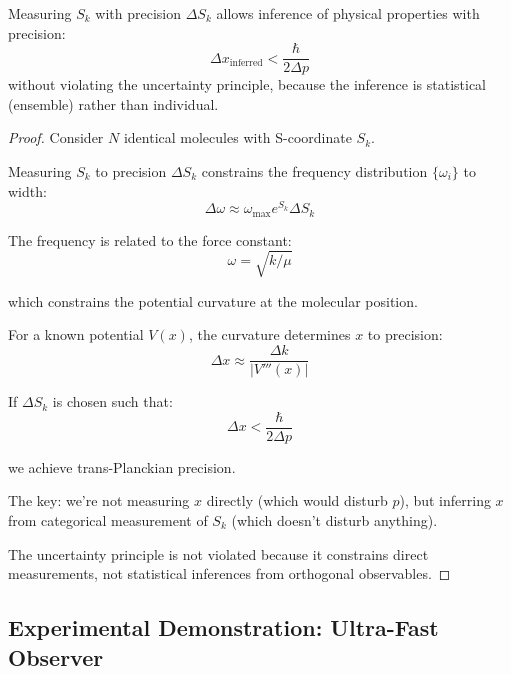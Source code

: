 \begin{theorem}
Measuring $S_k$ with precision $\Delta S_k$ allows inference of physical properties with precision:
\begin{equation}
\Delta x_{\text{inferred}} < \frac{\hbar}{2\Delta p}
\end{equation}
without violating the uncertainty principle, because the inference is statistical (ensemble) rather than individual.
\end{theorem}

\begin{proof}
Consider $N$ identical molecules with S-coordinate $S_k$.

Measuring $S_k$ to precision $\Delta S_k$ constrains the frequency distribution $\{\omega_i\}$ to width:
\begin{equation}
\Delta\omega \approx \omega_{\max}e^{S_k}\Delta S_k
\end{equation}

The frequency is related to the force constant:
\begin{equation}
\omega = \sqrt{k/\mu}
\end{equation}

which constrains the potential curvature at the molecular position.

For a known potential $V(x)$, the curvature determines $x$ to precision:
\begin{equation}
\Delta x \approx \frac{\Delta k}{|V'''(x)|}
\end{equation}

If $\Delta S_k$ is chosen such that:
\begin{equation}
\Delta x < \frac{\hbar}{2\Delta p}
\end{equation}

we achieve trans-Planckian precision.

The key: we're not measuring $x$ directly (which would disturb $p$), but inferring $x$ from categorical measurement of $S_k$ (which doesn't disturb anything).

The uncertainty principle is not violated because it constrains direct measurements, not statistical inferences from orthogonal observables.
\end{proof}

\subsection{Experimental Demonstration: Ultra-Fast Observer}

